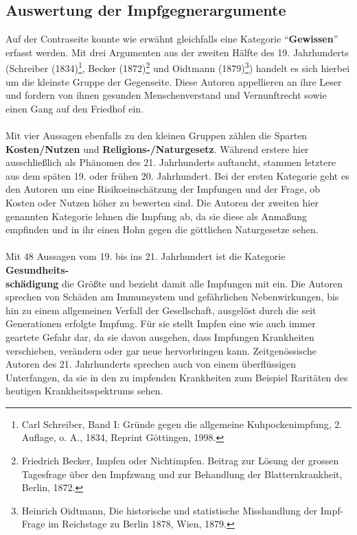 \documentclass[
    a4paper,
    12pt,
    hyphens,
    chapterprefix=true,
    headheight=33pt,
    footheight=29pt,
    headings=optiontohead, %
]{scrartcl}
\begin{document}
{\subsection{Auswertung der Impfgegnerargumente}
Auf der Contraseite konnte wie erwähnt gleichfalls eine Kategorie "`\textbf{Gewissen}"' erfasst werden. Mit drei Argumenten aus der zweiten Hälfte des 19. Jahrhunderts (Schreiber (1834)\footnote{Carl Schreiber, Band I: Gründe gegen die allgemeine Kuhpockenimpfung, 2. Auflage, o. A., 1834, Reprint Göttingen, 1998.}, Becker (1872)\footnote{Friedrich Becker, Impfen oder Nichtimpfen. Beitrag zur Lösung der grossen Tagesfrage über den Impfzwang und zur Behandlung der Blatternkrankheit, Berlin, 1872.} und Oidtmann (1879)\footnote{Heinrich Oidtmann, Die historische und statistische Misshandlung der Impf-Frage im Reichstage zu Berlin 1878, Wien, 1879.}) handelt es sich hierbei um die kleinste Gruppe der Gegenseite. Diese Autoren appellieren an ihre Leser und fordern von ihnen gesunden Menschenverstand und Vernunftrecht sowie einen Gang auf den Friedhof ein.\\
\\
Mit vier Aussagen ebenfalls zu den kleinen Gruppen zählen die Sparten \textbf{Kosten/Nutzen} und \textbf{Religions-/Naturgesetz}. Während erstere hier ausschließlich als Phänomen des 21. Jahrhunderts auftaucht, stammen letztere aus dem späten 19. oder frühen 20. Jahrhundert. Bei der ersten Kategorie geht es den Autoren um eine Risikoeinschätzung der Impfungen und der Frage, ob Kosten oder Nutzen höher zu bewerten sind. Die Autoren der zweiten hier genannten Kategorie lehnen die Impfung ab, da sie diese als Anmaßung empfinden und in ihr einen Hohn gegen die göttlichen Naturgesetze sehen.\\
\\
Mit 48 Aussagen vom 19. bis ins 21. Jahrhundert ist die Kategorie \textbf{Gesundheits-\\schädigung} die Größte  und bezieht damit alle Impfungen mit ein. Die Autoren sprechen von Schäden am Immunsystem und gefährlichen Nebenwirkungen, bis hin zu einem allgemeinen Verfall der Gesellschaft, ausgelöst durch die seit Generationen erfolgte Impfung. Für sie stellt Impfen eine wie auch immer geartete Gefahr dar, da sie davon ausgehen, dass Impfungen Krankheiten verschieben, verändern oder gar neue hervorbringen kann. Zeitgenössische Autoren des 21. Jahrhunderts sprechen auch von einem überflüssigen Unterfangen, da sie in den zu impfenden Krankheiten zum Beispiel Raritäten des heutigen Krankheitsspektrums sehen.\\
}
\end{document}
